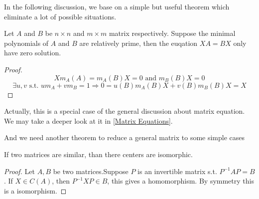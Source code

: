 In the following discussion, we base on a simple but useful theorem which eliminate a lot of possible situations.
\begin{theorem}
\label{relatively prime zero solution}
Let $A$ and $B$ be $n\times n$ and $m \times m$ matrix respectively. Suppose the minimal polynomials of $A$ and $B$ are relatively prime, then the euqation $XA=BX$ only have zero solution.
\end{theorem}
\begin{proof}
\[Xm_A(A)=m_A(B)X=0\text{ and }m_B(B)X=0\]
\[\exists u,v \text{ s.t. } um_A+vm_B=1\Longrightarrow 0=u(B)m_A(B)X+v(B)m_B(B)X=X\]
\end{proof}
\begin{remark}
Actually, this is a special case of the general discussion about matrix equation. We may take a deeper look at it in \ref{Matrix Equations}.
\end{remark}
And we need another theorem to reduce a general matrix to some simple cases
\begin{theorem}
If two matrices are similar, than there centers are isomorphic.
\end{theorem}
\begin{proof}
Let $A,B$ be two matrices.Suppose $P$ is an invertible matrix s.t. $P^{-1}AP=B$. If $X\in C(A)$, then $P^{-1}XP\in B$, this gives a homomorphism. By symmetry this is a isomorphism.
\end{proof}

